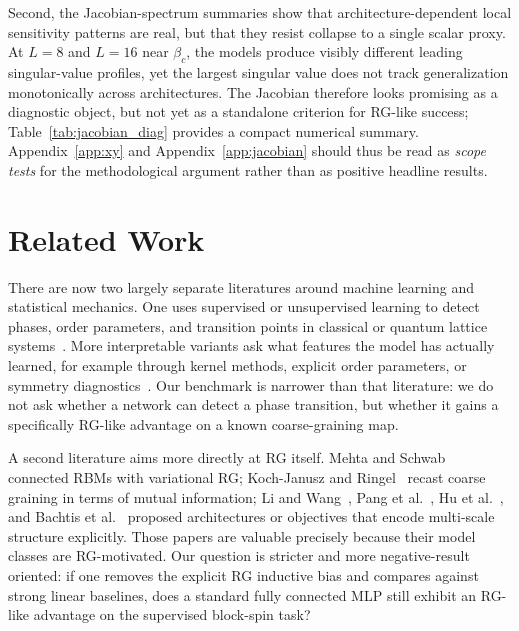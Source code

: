 \documentclass[12pt,a4paper]{memoir}
\begin{document}
Second, the Jacobian-spectrum summaries show that architecture-dependent local
sensitivity patterns are real, but that they resist collapse to a single scalar
proxy.  At $L=8$ and $L=16$ near $\beta_c$, the models produce visibly
different leading singular-value profiles, yet the largest singular value does
not track generalization monotonically across architectures.  The Jacobian
therefore looks promising as a diagnostic object, but not yet as a standalone
criterion for RG-like success; Table~\ref{tab:jacobian_diag} provides a compact
numerical summary.  Appendix~\ref{app:xy} and
Appendix~\ref{app:jacobian} should thus be read as \emph{scope tests} for the
methodological argument rather than as positive headline results.

\section{Related Work}
\label{sec:related}

There are now two largely separate literatures around machine learning and
statistical mechanics.  One uses supervised or unsupervised learning to detect
phases, order parameters, and transition points in classical or quantum lattice
systems~\citep{wang2016,carrasquilla2017,vannieuwenburg2017,hu2017,
wetzel2017,wangzhai2017,beach2018,zhang2019percolation,
rodrigueznieva2019,dcn2018}.  More interpretable variants ask what features the
model has actually learned, for example through kernel methods, explicit order
parameters, or symmetry diagnostics~\citep{ponte2017,wetzelscherzer2017,
greitemann2019,liu2019interpretable,decelle2019}.  Our benchmark is narrower
than that literature: we do not ask whether a network can detect a phase
transition, but whether it gains a specifically RG-like advantage on a known
coarse-graining map.

A second literature aims more directly at RG itself.  Mehta and
Schwab~\citep{mehta2014renormalization} connected RBMs with variational RG;
Koch-Janusz and Ringel~\citep{kochlug} recast coarse graining in terms of
mutual information; Li and Wang~\citep{li2018neuralrg}, Pang et
al.~\citep{pang2020neural}, Hu et al.~\citep{hu2020holographic}, and Bachtis
et al.~\citep{bachtis2021} proposed architectures or objectives that encode
multi-scale structure explicitly.  Those papers are valuable precisely because
their model classes are RG-motivated.  Our question is stricter and more
negative-result oriented: if one removes the explicit RG inductive bias and
compares against strong linear baselines, does a standard fully connected MLP
still exhibit an RG-like advantage on the supervised block-spin task?
\end{document}
